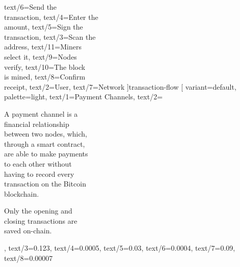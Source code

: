 \documentclass[aspectratio=169]{beamer}
\begin{document}
  text/6={Send the\\transaction},
  text/4={Enter the\\amount},
  text/5={Sign the\\transaction},
  text/3={Scan the\\address},
  text/11={Miners\\select it},
  text/9={Nodes\\verify},
  text/10={The block\\is mined},
  text/8={Confirm\\receipt},
  text/2={User},
  text/7={Network}
]{transaction-flow}
\gdef\studiocataloguename{\detokenize{cipher-mapping}}
\gdef\studiocataloguename{\detokenize{encryption-flow}}
\gdef\studiocataloguename{\detokenize{payoff-matrix}}
\gdef\studiocataloguename{\detokenize{payment-channel}}
\studiotemplate[
  variant={default},
  palette={light},
  text/1={Payment Channels},
  text/2={A payment channel is a\\financial relationship\\between two nodes, which,\\through a smart contract,\\are able to make payments\\to each other without\\having to record every\\transaction on the Bitcoin\\blockchain.\par Only the opening and\\closing transactions are\\saved on-chain.},
  text/3={0.123},
  text/4={0.0005},
  text/5={0.03},
  text/6={0.0004},
  text/7={0.09},
  text/8={0.00007}
\end{document}
